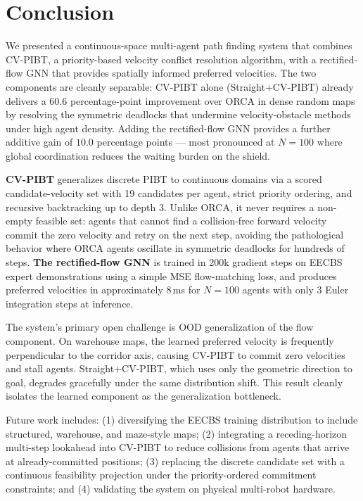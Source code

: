 \section{Conclusion}
\label{sec:conclusion}

We presented a continuous-space multi-agent path finding system that combines CV-PIBT, a priority-based velocity conflict resolution algorithm, with a rectified-flow GNN that provides spatially informed preferred velocities. The two components are cleanly separable: CV-PIBT alone (Straight+CV-PIBT) already delivers a $60.6$ percentage-point improvement over ORCA in dense random maps by resolving the symmetric deadlocks that undermine velocity-obstacle methods under high agent density. Adding the rectified-flow GNN provides a further additive gain of $10.0$ percentage points --- most pronounced at $N{=}100$ where global coordination reduces the waiting burden on the shield.

\textbf{CV-PIBT} generalizes discrete PIBT to continuous domains via a scored candidate-velocity set with 19 candidates per agent, strict priority ordering, and recursive backtracking up to depth 3. Unlike ORCA, it never requires a non-empty feasible set: agents that cannot find a collision-free forward velocity commit the zero velocity and retry on the next step, avoiding the pathological behavior where ORCA agents oscillate in symmetric deadlocks for hundreds of steps. \textbf{The rectified-flow GNN} is trained in 200k gradient steps on EECBS expert demonstrations using a simple MSE flow-matching loss, and produces preferred velocities in approximately 8\,ms for $N{=}100$ agents with only 3 Euler integration steps at inference.

The system's primary open challenge is OOD generalization of the flow component. On warehouse maps, the learned preferred velocity is frequently perpendicular to the corridor axis, causing CV-PIBT to commit zero velocities and stall agents. Straight+CV-PIBT, which uses only the geometric direction to goal, degrades gracefully under the same distribution shift. This result cleanly isolates the learned component as the generalization bottleneck.

Future work includes: (1) diversifying the EECBS training distribution to include structured, warehouse, and maze-style maps; (2) integrating a receding-horizon multi-step lookahead into CV-PIBT to reduce collisions from agents that arrive at already-committed positions; (3) replacing the discrete candidate set with a continuous feasibility projection under the priority-ordered commitment constraints; and (4) validating the system on physical multi-robot hardware.
